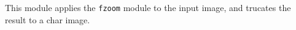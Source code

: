 This module applies the \verb+fzoom+ module to the input image,
and trucates the result to a char image.
